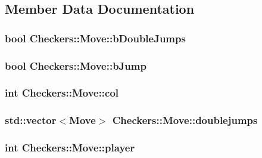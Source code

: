 \subsection{Member Data Documentation}
\hypertarget{structCheckers_1_1Move_a5626549bbd2a7d53ffe3ab183790a6c5}{
\subsubsection[{b\-Double\-Jumps}]{\setlength{\rightskip}{0pt plus 5cm}bool Checkers\-::\-Move\-::b\-Double\-Jumps}}\label{structCheckers_1_1Move_a5626549bbd2a7d53ffe3ab183790a6c5}
\hypertarget{structCheckers_1_1Move_a037e2f59611b937d8517454e98df3311}{
\subsubsection[{b\-Jump}]{\setlength{\rightskip}{0pt plus 5cm}bool Checkers\-::\-Move\-::b\-Jump}}\label{structCheckers_1_1Move_a037e2f59611b937d8517454e98df3311}
\hypertarget{structCheckers_1_1Move_ac78fddc38b24f19fe07c5cd61be59fb9}{
\subsubsection[{col}]{\setlength{\rightskip}{0pt plus 5cm}int Checkers\-::\-Move\-::col}}\label{structCheckers_1_1Move_ac78fddc38b24f19fe07c5cd61be59fb9}
\hypertarget{structCheckers_1_1Move_abc9f00e18c240b745872cbaf57f265fa}{
\subsubsection[{doublejumps}]{\setlength{\rightskip}{0pt plus 5cm}std\-::vector$<${\bf Move}$>$ Checkers\-::\-Move\-::doublejumps}}\label{structCheckers_1_1Move_abc9f00e18c240b745872cbaf57f265fa}
\hypertarget{structCheckers_1_1Move_a45735e4fab8cae7dc01f8ec8eba86679}{
\subsubsection[{player}]{\setlength{\rightskip}{0pt plus 5cm}int Checkers\-::\-Move\-::player}}\label{structCheckers_1_1Move_a45735e4fab8cae7dc01f8ec8eba86679}
